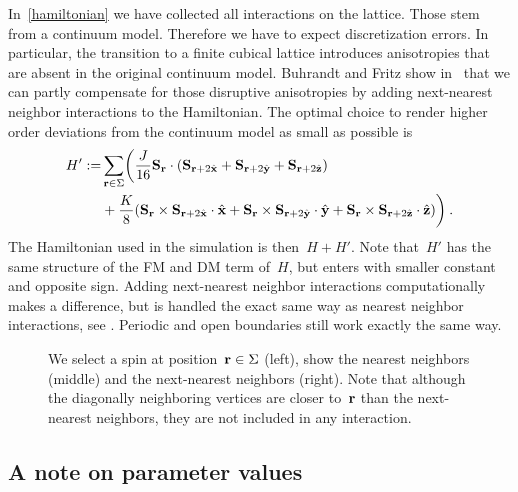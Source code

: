 In~\eqref{hamiltonian} we have collected all interactions on the lattice. Those
stem from a continuum model. Therefore we have to expect discretization errors.
In particular, the transition to a finite cubical lattice introduces
anisotropies that are absent in the original continuum model. Buhrandt and Fritz
show in~\cite{skyrmionlattice} that we can partly compensate for those
disruptive anisotropies by adding next-nearest neighbor interactions to the
Hamiltonian. The optimal choice to render higher order deviations from the
continuum model as small as possible is
%
\begin{align}\label{hamiltonianfull}
  H' := & \sum_{\mathbf{r} \in \Sigma} \biggl(
  \frac{J}{16} \mathbf{S}_{\mathbf{r}} \cdot (\mathbf{S}_{\mathbf{r}+2\hat{\mathbf{x}}} + \mathbf{S}_{\mathbf{r}+2\hat{\mathbf{y}}} + \mathbf{S}_{\mathbf{r}+2\hat{\mathbf{z}}}) \\
  &+ \frac{K}{8} (\mathbf{S}_{\mathbf{r}} \times \mathbf{S}_{\mathbf{r}+2\hat{\mathbf{x}}} \cdot \hat{\mathbf{x}} +
        \mathbf{S}_{\mathbf{r}} \times \mathbf{S}_{\mathbf{r}+2\hat{\mathbf{y}}} \cdot \hat{\mathbf{y}} +
        \mathbf{S}_{\mathbf{r}} \times \mathbf{S}_{\mathbf{r}+2\hat{\mathbf{z}}} \cdot \hat{\mathbf{z}})\biggr)\:.
\end{align}
%
The Hamiltonian used in the simulation is then~$H + H'$. Note that~$H'$ has the
same structure of the FM and DM term of~$H$, but enters with smaller constant
and opposite sign. Adding next-nearest neighbor interactions computationally
makes a difference, but is handled the exact same way as nearest neighbor
interactions, see . Periodic and open boundaries still work
exactly the same way.

\begin{figure}
  \centering
  \caption{We select a spin at position~$\mathbf{r} \in \Sigma$ (left), show the nearest
  neighbors (middle) and the next-nearest neighbors (right). Note that although
  the diagonally neighboring vertices are closer to~$\mathbf{r}$ than the next-nearest
  neighbors, they are not included in any interaction.}
\label{fig:interact}
\end{figure}

\subsection{A note on parameter values}


